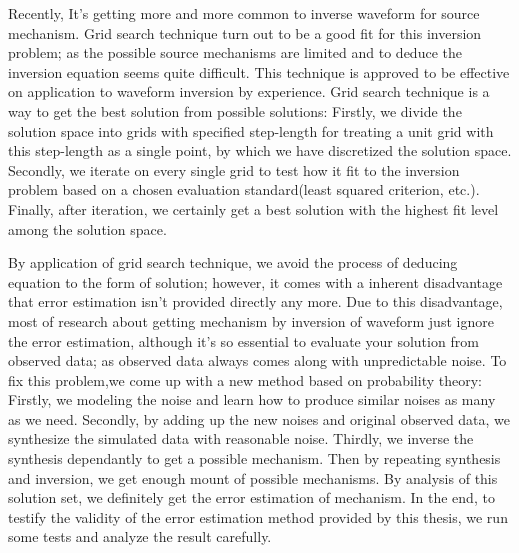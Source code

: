 \begin{enabstract}
Recently, It's getting more and more common to inverse waveform for source mechanism. Grid search technique turn out to be a good fit for this inversion problem; as the possible source mechanisms are limited and to deduce the inversion equation seems quite difficult. This technique is approved to be effective on application to waveform inversion by experience. Grid search technique is a way to get the best solution from possible solutions: Firstly, we divide the solution space into grids with specified step-length for treating a unit grid with this step-length as a single point, by which we have discretized the solution space. Secondly, we iterate on every single grid to test how it fit to the inversion problem based on a chosen evaluation standard(least squared criterion, etc.). Finally, after iteration, we certainly get a best solution with the highest fit level among the solution space.

By application of grid search technique, we avoid the process of deducing equation to the form of solution; however, it comes with a inherent disadvantage that error estimation isn't provided directly any more. Due to this disadvantage, most of research about getting mechanism by inversion of waveform just ignore the error estimation, although it's so essential to evaluate your solution from observed data; as observed data always comes along with unpredictable noise. To fix this problem,we come up with a new method based on probability theory: Firstly, we modeling the noise and learn how to produce similar noises as many as we need. Secondly, by adding up the new noises and original observed data, we synthesize the simulated data with reasonable noise. Thirdly, we inverse the synthesis dependantly to get a possible mechanism. Then by repeating synthesis and inversion, we get enough mount of possible mechanisms. By analysis of this solution set, we definitely get the error estimation of mechanism. In the end, to testify the validity of the error estimation method provided by this thesis, we run some tests and analyze the result carefully.


\end{enabstract}
